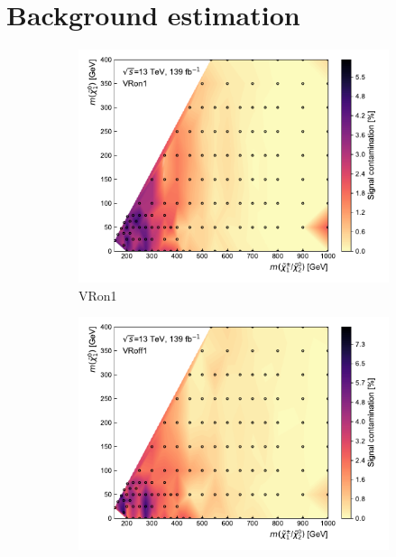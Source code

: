 
\ifpdf
\graphicspath{{chapter-background/Figs/Raster/}{chapter-background/Figs/PDF/}{chapter-background/Figs/}}
\else
\graphicspath{{chapter-background/Figs/Vector/}{chapter-background/Figs/}}
\fi

\section{Background estimation}\label{app:background_estimation}


 \begin{figure}
	\centering
	\begin{subfigure}[b]{0.5\linewidth}
		\centering\includegraphics[width=1.0\textwidth]{signal_contamination/plot_VRon1}
		\caption{VRon1\label{fig:signal_contamination_VRon1}}
	\end{subfigure}\hfill
	\begin{subfigure}[b]{0.5\linewidth}
		\centering\includegraphics[width=1.0\textwidth]{signal_contamination/plot_VRoff1}

\end{subfigure}
\end{figure}
